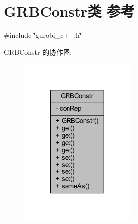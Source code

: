\hypertarget{classGRBConstr}{}\section{G\+R\+B\+Constr类 参考}
\label{classGRBConstr}


{\ttfamily \#include \char`\"{}gurobi\+\_\+c++.\+h\char`\"{}}



G\+R\+B\+Constr 的协作图\+:
\nopagebreak
\begin{figure}[H]
\begin{center}
\leavevmode
\includegraphics[width=161pt]{classGRBConstr__coll__graph}
\end{center}
\end{figure}
